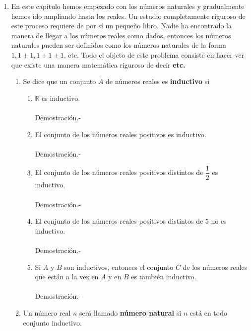 \begin{enumerate}
       \item En este capítulo hemos empezado con los números naturales y gradualmente hemos ido ampliando hasta los reales. Un estudio completamente riguroso de este proceso requiere de por sí un pequeño libro. Nadie ha encontrado la manera de llegar a los números reales como dados, entonces los números naturales pueden ser definidos como los números naturales de la forma $1,1+1,1+1+1$, etc. Todo el objeto de este problema consiste en hacer ver que existe una manera matemática riguroso de decir \textbf{etc.} 
          \begin{enumerate}[\bfseries (a)]
             \item Se dice que un conjunto $A$ de números reales es \textbf{inductivo} si
                \begin{enumerate}[\bfseries (i)]
                   \item $\mathbb{R}$ es inductivo.\\\\
                      Demostración.-\;
                   \item El conjunto de los números reales positivos es inductivo.\\\\
                      Demostración.-\;
                   \item El conjunto de los números reales positivos distintos de $\dfrac{1}{2}$ es inductivo.\\\\
                      Demostración.-\;
                   \item El conjunto de los números reales positivos distintos de $5$ no es inductivo.\\\\
                      Demostración.-\;
                   \item Si $A$ y $B$ son inductivos, entonces el conjunto $C$ de los números reales que están a la vez en $A$ y en $B$ es también inductivo.\\\\
                      Demostración.-\;
                \end{enumerate}
             \item Un número real $n$ será llamado \textbf{número natural} si $n$ está en todo conjunto inductivo.

\end{enumerate}
\end{enumerate}
